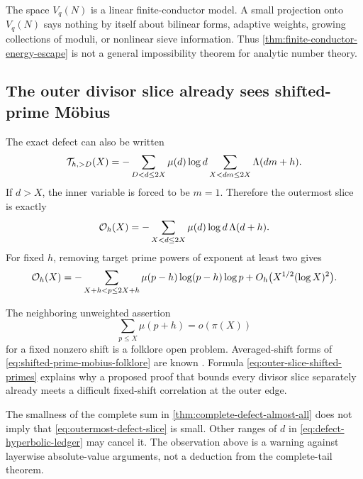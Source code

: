 \begin{remark}
The space $V_q(N)$ is a linear finite-conductor model.  A small projection
onto $V_q(N)$ says nothing by itself about bilinear forms, adaptive weights,
growing collections of moduli, or nonlinear sieve information.  Thus
\cref{thm:finite-conductor-energy-escape} is not a general impossibility
theorem for analytic number theory.
\end{remark}

\subsection{The outer divisor slice already sees shifted-prime M\"obius}
\label{subsec:outer-divisor-slice}

The exact defect can also be written
\begin{equation}\label{eq:defect-hyperbolic-ledger}
 \mathcal T_{h,>D}(X)
 =-\sum_{D<d\le2X}\mu(d)\log d
   \sum_{X<dm\le2X}\Lambda(dm+h).
\end{equation}
If $d>X$, the inner variable is forced to be $m=1$.  Therefore the outermost
slice is exactly
\begin{equation}\label{eq:outermost-defect-slice}
 \mathcal O_h(X)
 =-\sum_{X<d\le2X}\mu(d)\log d\,\Lambda(d+h).
\end{equation}
For fixed $h$, removing target prime powers of exponent at least two gives
\begin{equation}\label{eq:outer-slice-shifted-primes}
 \mathcal O_h(X)
 =-\sum_{X+h<p\le2X+h}
   \mu(p-h)\log(p-h)\log p
 +O_h\bigl(X^{1/2}(\log X)^2\bigr).
\end{equation}

The neighboring unweighted assertion
\begin{equation}\label{eq:shifted-prime-mobius-folklore}
 \sum_{p\le X}\mu(p+h)=o(\pi(X))
\end{equation}
for a fixed nonzero shift is a folklore open problem.  Averaged-shift forms
of \eqref{eq:shifted-prime-mobius-folklore} are known
\citep{Lichtman2022,LichtmanTeravainen2022}.  Formula
\eqref{eq:outer-slice-shifted-primes} explains why a proposed proof that
bounds every divisor slice separately already meets a difficult
fixed-shift correlation at the outer edge.

\begin{remark}
The smallness of the complete sum in
\cref{thm:complete-defect-almost-all} does not imply that
\eqref{eq:outermost-defect-slice} is small.  Other ranges of $d$ in
\eqref{eq:defect-hyperbolic-ledger} may cancel it.  The observation above is
a warning against layerwise absolute-value arguments, not a deduction from
the complete-tail theorem.
\end{remark}
